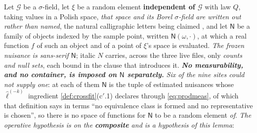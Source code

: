 \begin{lemma}\label{lem:pfreeze}
Let $\mathcal G$ be a $\sigma$-field, let $\xi$ be a random element \textbf{independent of $\mathcal G$}
with law $Q$, taking values in a Polish space, \emph{that space and its Borel $\sigma$-field are written
out rather than named}, the natural calligraphic letters being claimed
, and let $\mathsf N$ be a family of objects indexed by the sample point, written
$\mathsf N(\omega,\cdot)$, at which a
real function $f$ of such an object and of a point of $\xi$'s space is evaluated.
\emph{The frozen nuisance is sans-serif $\mathsf N$}; italic $N$ carries, across the three live
files, only \emph{counts and null sets}, each bound in the clause that introduces it.
\emph{\textbf{No
measurability, and no container, is imposed on $\mathsf N$ separately.}}
\emph{Six of the nine sites could not supply one}: at each of them $\mathsf N$ is
the
tuple of estimated nuisances whose $\hat\ell^{(-k)}$ ingredient \cref{def:crossfit}\textup{(c$'$.1)}
declares through \eqref{eq:prodmeas}, of which that definition says in terms ``no equivalence class is
formed and no representative is chosen'', so there is no space of functions for $\mathsf N$ to be a
random
element \emph{of}. \emph{The operative hypothesis is on the
\textbf{composite} and is a hypothesis of this lemma}:
\begin{equation}\label{eq:freezecomp}

\end{equation}
\end{lemma}
